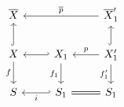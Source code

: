 \documentclass[crop,dvisvgm]{standalone}
\begin{document}
\[\begin {tikzcd}
        \overline {X}
        && \overline {X}'_1
          \ar [ll,swap,"\overline {p}"]
      \\X
          \ar [u,hook]
          \ar [d,swap,"f"]
        & X_1
          \ar [l,hook']
          \ar [d,swap,"f_1"]
        & X'_1
          \ar [u,hook]
          \ar [l,swap,"p"]
          \ar [d,swap,"f'_1"]
      \\S
        & S_1
          \ar [l,hook',"i"]
        & S_1
          \ar [l,equals]
      \end {tikzcd}\]
\end{document}

